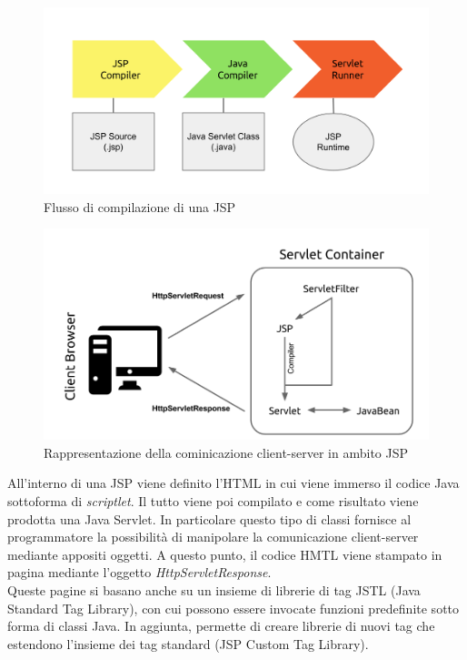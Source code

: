 	\begin{figure}[H]
		\centering
	   	\includegraphics[width=1\textwidth]{immagini/jsp_compile}
	   	\caption{Flusso di compilazione di una JSP}
	\end{figure}
	
	\begin{figure}[H]
		\centering
	   	\includegraphics[width=1\textwidth]{immagini/jsp_comunications}
	   	\caption{Rappresentazione della cominicazione client-server in ambito JSP}
	\end{figure}	
	
	All'interno di una JSP viene definito l'HTML in cui viene immerso il codice Java sottoforma di \textit{scriptlet}. Il tutto viene poi compilato e come risultato viene prodotta una Java Servlet\glossario . In particolare questo tipo di classi fornisce al programmatore la possibilità di manipolare la comunicazione client-server mediante appositi oggetti. A questo punto, il codice HMTL viene stampato in pagina mediante l'oggetto \textit{HttpServletResponse}.\\
	
	Queste pagine si basano anche su un insieme di librerie di tag JSTL (Java Standard Tag Library), con cui possono essere invocate funzioni predefinite sotto forma di classi Java. In aggiunta, permette di creare librerie di nuovi tag che estendono l'insieme dei tag standard (JSP Custom Tag Library).
	
